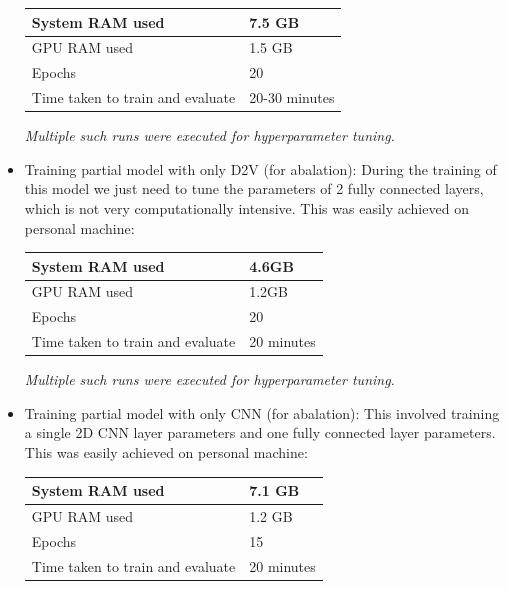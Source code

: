 \documentclass[11pt,a4paper]{article}
\begin{document}
\begin{itemize}
\begin{small}
\begin{tabular}{ ll }
	\hline
   		System RAM used & 7.5 GB \\
  	\hline
    		GPU RAM used & 1.5 GB \\
  	\hline
  		Epochs & 20 \\
  	\hline
  		Time taken to train and evaluate & 20-30 minutes \\
  	\hline
\end{tabular}
\end{small}
\newline
\textit{Multiple such runs were executed for hyperparameter tuning.}

	\item Training partial model with only D2V (for abalation): During the training of this model we just need to tune the parameters of 2 fully connected layers, which is not very computationally intensive. This was easily achieved on personal machine:
\newline

\begin{small}
\begin{tabular}{ ll }
	\hline
   		System RAM used & 4.6GB \\
  	\hline
    		GPU RAM used & 1.2GB \\
  	\hline
  		Epochs & 20 \\
  	\hline
  		Time taken to train and evaluate & 20 minutes \\
  	\hline
\end{tabular}
\end{small}
\newline
\textit{Multiple such runs were executed for hyperparameter tuning.}

	\item Training partial model with only CNN (for abalation): This involved training a single 2D CNN layer parameters and one fully connected layer parameters. This was easily achieved on personal machine:
\newline

\begin{small}
\begin{tabular}{ ll }
	\hline
   		System RAM used & 7.1 GB \\
  	\hline
    		GPU RAM used & 1.2 GB \\
  	\hline
  		Epochs & 15 \\
  	\hline
  		Time taken to train and evaluate & 20 minutes \\
  	\hline
\end{tabular}
\end{small}
\newline	


\end{itemize}
\end{document}
